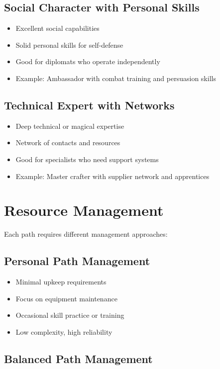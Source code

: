 \documentclass[11pt,twoside,openany]{book}
\begin{document}
\subsection*{Social Character with Personal Skills}

\begin{itemize}
\item Excellent social capabilities
\item Solid personal skills for self-defense
\item Good for diplomats who operate independently
\item Example: Ambassador with combat training and persuasion skills
\end{itemize}

\subsection*{Technical Expert with Networks}

\begin{itemize}
\item Deep technical or magical expertise
\item Network of contacts and resources
\item Good for specialists who need support systems
\item Example: Master crafter with supplier network and apprentices
\end{itemize}

\section*{Resource Management} 

Each path requires different management approaches:

\subsection*{Personal Path Management}

\begin{itemize}
\item Minimal upkeep requirements
\item Focus on equipment maintenance
\item Occasional skill practice or training
\item Low complexity, high reliability
\end{itemize}

\subsection*{Balanced Path Management}
\end{document}
